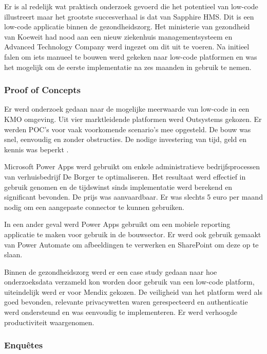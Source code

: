 Er is al redelijk wat praktisch onderzoek gevoerd die het potentieel van low-code illustreert maar het grootste succesverhaal is dat van Sapphire HMS. Dit is een low-code applicatie binnen de gezondheidszorg. Het ministerie van gezondheid van Koeweit had nood aan een nieuw ziekenhuis managementsysteem en Advanced Technology Company werd ingezet om dit uit te voeren. Na initieel falen om iets manueel te bouwen werd gekeken naar low-code platformen en was het mogelijk om de eerste implementatie na zes maanden in gebruik te nemen. \autocite{Bashar2017}

\subsubsection{Proof of Concepts}

Er werd onderzoek gedaan naar de mogelijke meerwaarde van low-code in een KMO omgeving. Uit vier marktleidende platformen werd Outsystems gekozen. Er werden POC's voor vaak voorkomende scenario's mee opgesteld. De bouw was snel, eenvoudig en zonder obstructies. De nodige investering van tijd, geld en kennis was beperkt \autocite{Devloo2018}.

Microsoft Power Apps werd gebruikt om enkele administratieve bedrijfsprocessen van verhuisbedrijf De Borger te optimaliseren. Het resultaat werd effectief in gebruik genomen en de tijdswinst sinds implementatie werd berekend en significant bevonden. De prijs was aanvaardbaar. Er was slechts 5 euro per maand nodig om een aangepaste connector te kunnen gebruiken. \autocite{Spriet2019}

In een ander geval werd Power Apps gebruikt om een mobiele reporting applicatie te maken voor gebruik in de bouwsector. Er werd ook gebruik gemaakt van Power Automate om afbeeldingen te verwerken en SharePoint om deze op te slaan. \autocite{Aho2018}

Binnen de gezondheidszorg werd er een case study gedaan naar hoe onderzoeksdata verzameld kon worden door gebruik van een low-code platform, uiteindelijk werd er voor Mendix gekozen. De veiligheid van het platform werd als goed bevonden, relevante privacywetten waren gerespecteerd en authenticatie werd ondersteund en was eenvoudig te implementeren. Er werd verhoogde productiviteit waargenomen. \autocite{Totterdale2018}

\subsubsection{Enquêtes}

